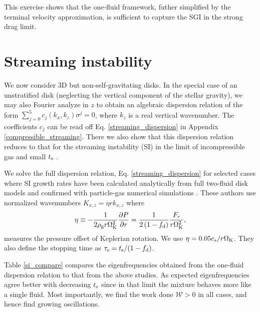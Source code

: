 This exercise shows that the one-fluid framework, futher simplified by
the terminal velocity approximation, is sufficient to capture the SGI
in the strong drag limit. 

\section{Streaming instability}\label{si}
We now consider 3D but non-self-gravitating disks.  
In the special case of an unstratified disk (neglecting the vertical
component of the stellar gravity), we may also Fourier analyze in $z$
to obtain an algebraic dispersion relation of the form  
$\sum_{j=0}^{5}c_j(k_x,k_z)\sigma^j = 0$, where $k_z$ is a real
vertical wavenumber. The coefficients $c_j$ can be read 
off Eq. \ref{streaming_dispersion} in  Appendix \ref{compressible_streaming}. 
There we also show that this dispersion relation reduces to that for
the streaming instability (SI) in the limit of incompressible gas and small
$t_\mathrm{s}$ \citep{youdin05a,jacquet11}.   
 


We solve the full dispersion relation, Eq. \ref{streaming_dispersion} for selected cases where SI  
growth rates have been 
calculated analytically from full two-fluid disk models and confirmed
with particle-gas numerical simulations 
\citep[namely][]{youdin07b,bai10b}. These authors use normalized
wavenumbers $K_{x,z} = \eta r k_{x,z}$ where
\begin{align} 
  \eta \equiv -\frac{1}{2\rho_\mathrm{g} r\Omega_{\rm K}^2}\frac{\partial P}{\partial r} = 
  \frac{1}{2\left(1-f_\mathrm{d}\right)}\frac{F_r}{r\Omega_{\rm K}^2}, 
\end{align} 
measures the pressure offset of Keplerian rotation. We use
$\eta=0.05c_s/r\Omega_{\rm K}$. They also define the stopping time as
$\tau_\mathrm{s}=t_\mathrm{s}/(1-f_\mathrm{d})$.  

Table \ref{si_compare} compares the eigenfrequencies obtained from the
one-fluid dispersion relation to that from the above studies. As  
expected eigenfrequencies agree better with decreasing $t_\mathrm{s}$ since
in that limit the mixture behaves more like a single fluid. Most 
importantly, we find the work done $\mathcal{W}>0$ in all cases, and
hence find growing oscillations. 

